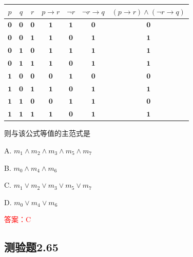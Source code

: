 \documentclass[UTF8, heading=true]{ctexart}
\begin{document}
\begin{table}[H]
  \centering
\begin{tabular}{c|c|c|c|c|c|c}
\hline$p$ & $q$ & $r$ & $p \rightarrow r$ & $\neg r$ & $\neg r \rightarrow q$ & $(p \rightarrow r) \wedge(\neg r \rightarrow q)$ \\
\hline $\mathbf{0}$ & $\mathbf{0}$ & $\mathbf{0}$ & $\mathbf{1}$ & $\mathbf{1}$ & $\mathbf{0}$ & $\mathbf{0}$ \\
\hline $\mathbf{0}$ & $\mathbf{0}$ & $\mathbf{1}$ & $\mathbf{1}$ & $\mathbf{0}$ & $\mathbf{1}$ & $\mathbf{1}$ \\
\hline $\mathbf{0}$ & $\mathbf{1}$ & $\mathbf{0}$ & $\mathbf{1}$ & $\mathbf{1}$ & $\mathbf{1}$ & $\mathbf{1}$ \\
\hline $\mathbf{0}$ & $\mathbf{1}$ & $\mathbf{1}$ & $\mathbf{1}$ & $\mathbf{0}$ & $\mathbf{1}$ & $\mathbf{1}$ \\
\hline $\mathbf{1}$ & $\mathbf{0}$ & $\mathbf{0}$ & $\mathbf{0}$ & $\mathbf{1}$ & $\mathbf{0}$ & $\mathbf{0}$ \\
\hline $\mathbf{1}$ & $\mathbf{0}$ & $\mathbf{1}$ & $\mathbf{1}$ & $\mathbf{0}$ & $\mathbf{1}$ & $\mathbf{1}$ \\
\hline $\mathbf{1}$ & $\mathbf{1}$ & $\mathbf{0}$ & $\mathbf{0}$ & $\mathbf{1}$ & $\mathbf{1}$ & $\mathbf{0}$ \\
\hline $\mathbf{1}$ & $\mathbf{1}$ & $\mathbf{1}$ & $\mathbf{1}$ & $\mathbf{0}$ & $\mathbf{1}$ & $\mathbf{1}$ \\
\hline
\end{tabular}
\end{table}

则与该公式等值的主范式是

A. $
m_1 \wedge m_2 \wedge m_3 \wedge m_5 \wedge m_7
$

B. $m_0 \wedge m_4 \wedge m_6$

C. $m_1 \vee m_2 \vee m_3 \vee m_5 \vee m_7$

D. $m_0 \vee m_4 \vee m_6$

\textcolor{red}{答案：C}

\subsection{测验题2.65}
\end{document}
